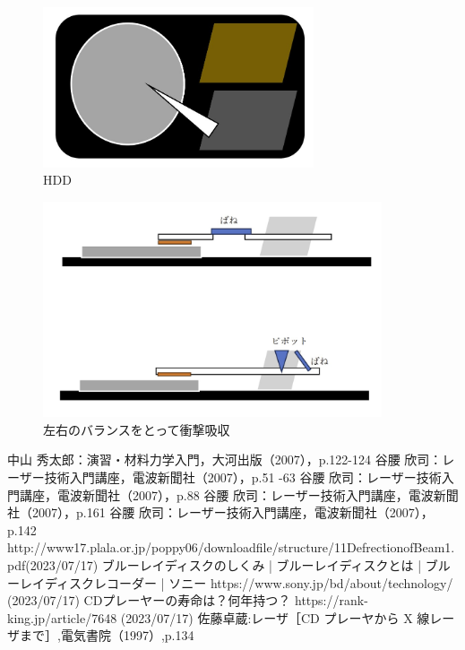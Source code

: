 \documentclass[a4paper,12pt]{jsarticle}
\begin{document}
\begin{enumerate}
\begin{figure}[h]
  \centering
  \includegraphics[width=8cm]{10.jpg}
  \caption{HDD}
\end{figure}
\begin{figure}[h]
  \centering
  \includegraphics[width=10cm]{11.jpg}
  \caption{左右のバランスをとって衝撃吸収}
\end{figure}
\end{enumerate}

\begin{thebibliography}{20}
  \bibitem{} 
  中山 秀太郎：演習・材料力学入門，大河出版（2007），p.122-124
  \bibitem{} 
  谷腰 欣司：レーザー技術入門講座，電波新聞社（2007），p.51 -63
  \bibitem{}
  谷腰 欣司：レーザー技術入門講座，電波新聞社（2007），p.88
  \bibitem{}
  谷腰 欣司：レーザー技術入門講座，電波新聞社（2007），p.161
  \bibitem{}
  谷腰 欣司：レーザー技術入門講座，電波新聞社（2007），p.142
  \bibitem{}
  http://www17.plala.or.jp/poppy06/downloadfile/structure/11DefrectionofBeam1.pdf(2023/07/17)
  \bibitem{} 
  ブルーレイディスクのしくみ | ブルーレイディスクとは | ブルーレイディスクレコーダー | ソニー https://www.sony.jp/bd/about/technology/ (2023/07/17)
  \bibitem{} 
  CDプレーヤーの寿命は？何年持つ？ https://rank-king.jp/article/7648 (2023/07/17)
  \bibitem{}
  佐藤卓蔵:レーザ［CD プレーヤから X 線レーザまで］,電気書院（1997）,p.134
  \end{thebibliography}
\end{document}
